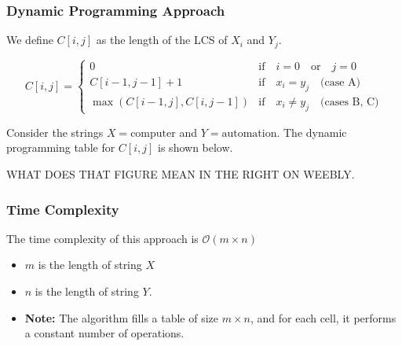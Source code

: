 \subsubsection{Dynamic Programming Approach}
\begin{definition}
    We define \(C[i, j]\) as the length of the LCS of \(X_i\) and \(Y_j\).

    \begin{equation}
    C[i, j] = 
    \begin{cases}
    0 & \text{if} \quad i = 0 \quad \text{or} \quad j = 0 \\
    C[i-1, j-1] + 1 & \text{if} \quad x_i = y_j \quad \text{(case A)} \\
    \max(C[i-1, j], C[i, j-1]) & \text{if} \quad x_i \neq y_j \quad \text{(cases B, C)}
    \end{cases}
    \end{equation}

\end{definition}

\begin{intuition}
    
\end{intuition}

\begin{example}
Consider the strings \(X = \text{computer}\) and \(Y = \text{automation}\). The dynamic programming table for \(C[i,j]\) is shown below.


WHAT DOES THAT FIGURE MEAN IN THE RIGHT ON WEEBLY.
\end{example}

\subsubsection{Time Complexity}
\begin{definition}
    The time complexity of this approach is \(\mathcal{O}(m \times n)\)
    \begin{itemize}
        \item \(m\) is the length of string \(X\)
        \item \(n\) is the length of string \(Y\). 
        \item \textbf{Note:} The algorithm fills a table of size \(m \times n\), and for each cell, it performs a constant number of operations.
    \end{itemize}
\end{definition}

